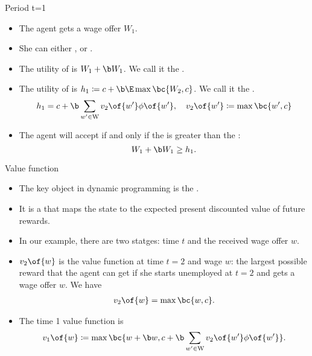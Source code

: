 \documentclass[11pt,xcolor={dvipsnames},aspectratio=159,hyperref={pdftex,pdfpagemode=UseNone,hidelinks,pdfdisplaydoctitle=true},usepdftitle=false]{beamer}
\begin{document}
\begin{frame}{Period t=1}
    \begin{itemize}
    \item The agent gets a wage offer $W_1$. 
    \item She can either , or .
    \item The utility of  is $W_1 + \b W_1$. We call it the .
    \item The utility of  is $h_1 \coloneq c + \b \E \max \bc{W_2,c}$. We call it the . \begin{align*}
        h_1 = c + \b \sum_{w^\prime \in \text{W}} v_2\of{w^\prime} \phi\of{w^\prime}, \quad v_2\of{w^\prime} \coloneq \max \bc{w^\prime,c}
    \end{align*} 
    \item The agent will accept if and only if the  is greater than the : $$W_1 + \b W_1 \geq h_1.$$
    \end{itemize}
\end{frame}

\begin{frame}{Value function}
    \begin{itemize}
    \item The key object in dynamic programming is the . 
    \item It is a  that maps the state to the  expected present discounted value of future rewards.
    \item In our example, there are two statges: time $t$ and the received wage offer $w$.
    \item $v_2\of{w}$ is the value function at time $t=2$ and wage $w$: the largest possible reward that the agent can get if she starts unemployed at $t=2$ and gets a wage offer $w$. We have \begin{align*} v_2\of{w} = \max \bc{w,c}.\end{align*}
    \item The time 1 value function is \begin{align*}
        v_1\of{w} \coloneq \max \bc{w + \b w, c + \b \sum_{w^\prime \in \text{W}} v_2\of{w^\prime} \phi\of{w^\prime}}.
    \end{align*}
\end{itemize}
\end{frame}
\end{document}
